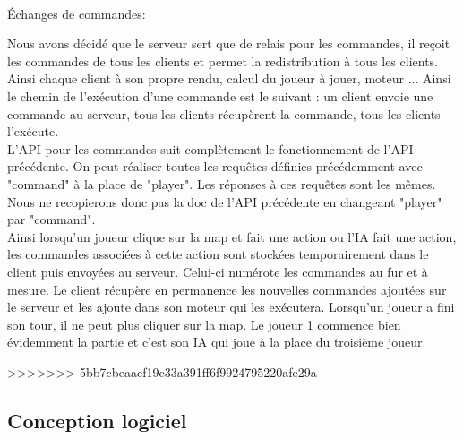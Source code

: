 \documentclass[12pt,a4paper]{article}
\begin{document}
\\Échanges de commandes:

Nous avons décidé que le serveur sert que de relais pour les commandes, il reçoit les commandes de tous les clients et permet la redistribution à tous les clients. Ainsi chaque client à son propre rendu, calcul du joueur à jouer, moteur ... Ainsi le chemin de l'exécution d'une commande est le suivant : un client envoie une commande au serveur, tous les clients récupèrent la commande, tous les clients l'exécute.\\
L'API pour les commandes suit complètement le fonctionnement de l'API précédente. On peut réaliser toutes les requêtes définies précédemment avec "command" à la place de "player". Les réponses à ces requêtes sont les mêmes. Nous ne recopierons donc pas la doc de l'API précédente en changeant "player" par "command".\\  
Ainsi lorsqu'un joueur clique sur la map et fait une action ou l'IA fait une action, les commandes associées à cette action sont stockées temporairement dans le client puis envoyées au serveur.  Celui-ci numérote les commandes au fur et à mesure. Le client récupère en permanence les nouvelles commandes ajoutées sur le serveur et les ajoute dans son moteur qui les exécutera. Lorsqu'un joueur a fini son tour, il ne peut plus cliquer sur la map. Le joueur 1 commence bien évidemment la partie et c'est son IA qui joue à la place du troisième joueur.

>>>>>>> 5bb7cbeaacf19c33a391ff6f9924795220afe29a
\subsection{Conception logiciel}
\end{document}
